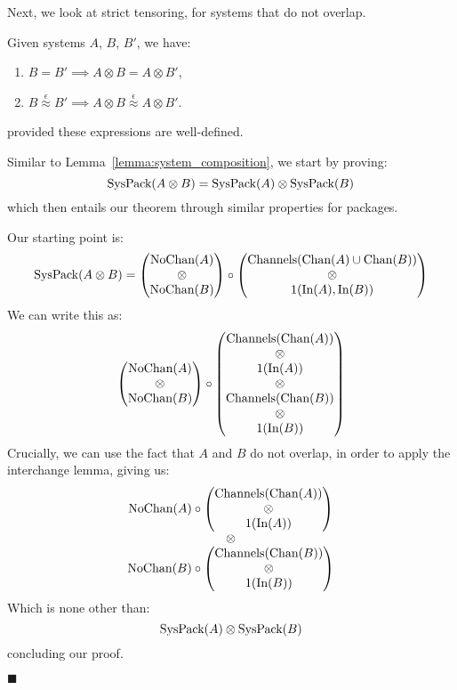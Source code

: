 Next, we look at strict tensoring, for systems that do not overlap.

\begin{lemma}
  Given systems $A$, $B$, $B'$, we have:
  \begin{enumerate}
    \item $B = B' \implies A \otimes B = A \otimes B'$,
    \item $B \overset{\epsilon}{\approx} B' \implies A \otimes B \overset{\epsilon}{\approx} A \otimes B'$.
  \end{enumerate}
  provided these expressions are well-defined.

   Similar to Lemma~\ref{lemma:system_composition},
  we start by proving:
  $$
  \text{SysPack}(A \otimes B) = \text{SysPack}(A) \otimes \text{SysPack}(B)
  $$
  which then entails our theorem through similar properties for packages.

  Our starting point is:
  $$
  \text{SysPack}(A \otimes B) =
  \begin{pmatrix}
    \text{NoChan}(A)\cr
    \otimes\cr
    \text{NoChan}(B)
  \end{pmatrix}
  \circ
  \begin{pmatrix}
    \text{Channels}(\text{Chan}(A) \cup \text{Chan}(B))\cr
    \otimes\cr
    1(\text{In}(A), \text{In}(B))
  \end{pmatrix}
  $$
  We can write this as:
  $$
  \begin{pmatrix}
    \text{NoChan}(A)\cr
    \otimes\cr
    \text{NoChan}(B)
  \end{pmatrix}
  \circ
  \begin{pmatrix}
    \text{Channels}(\text{Chan}(A))\cr
    \otimes\cr
    1(\text{In}(A))\cr
    \otimes\cr
    \text{Channels}(\text{Chan}(B))\cr
    \otimes\cr
    1(\text{In}(B))\cr
  \end{pmatrix}
  $$
  Crucially, we can use the fact that $A$ and $B$ do not overlap,
  in order to apply the interchange lemma, giving us:
  $$
  \begin{matrix}
    \text{NoChan}(A) \circ \begin{pmatrix}
    \text{Channels}(\text{Chan}(A))\cr
    \otimes\cr
    1(\text{In}(A))\cr
    \end{pmatrix}\cr
    \otimes\cr
    \text{NoChan}(B) \circ \begin{pmatrix}
    \text{Channels}(\text{Chan}(B))\cr
    \otimes\cr
    1(\text{In}(B))\cr
    \end{pmatrix}
  \end{matrix}
  $$
  Which is none other than:
  $$
  \text{SysPack}(A) \otimes \text{SysPack}(B)
  $$
  concluding our proof.

  $\blacksquare$
\end{lemma}

